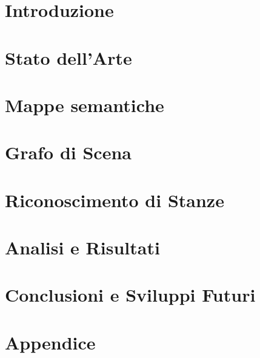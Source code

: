 \documentclass[a4paper, oneside]{book}
\author{Luca Brini}
\begin{document}


\tableofcontents

\chapter*{Introduzione}



\chapter{Stato dell'Arte}


\chapter{Mappe semantiche}



\chapter{Grafo di Scena}\label{chap:grafo_di_scena}



\chapter{Riconoscimento di Stanze}\label{chap:riconoscimento_stanze}



\chapter{Analisi e Risultati}



\chapter{Conclusioni e Sviluppi Futuri}



\appendix
\chapter{Appendice}




\printnoidxglossaries

\printbibliography
\end{document}

